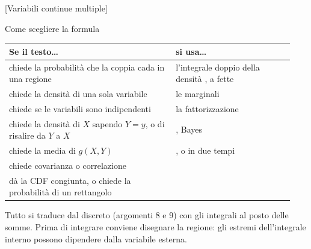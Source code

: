 [Variabili continue
  multiple]

\begin{scelta}{Come scegliere la formula}
\renewcommand{\arraystretch}{1.25}
\begin{tabular}{@{}P{0.55\linewidth}P{0.39\linewidth}@{}}
  \toprule
  \textbf{Se il testo\ldots} & \textbf{si usa\ldots} \\
  \midrule
  chiede la probabilità che la coppia cada in una regione & l'integrale doppio della densità ,
    a fette \\
  chiede la densità di una sola variabile & le marginali  \\
  chiede se le variabili sono indipendenti & la fattorizzazione  \\
  chiede la densità di $X$ sapendo $Y = y$, o di risalire da $Y$ a $X$ & , Bayes  \\
  chiede la media di $g(X, Y)$ & , o in due tempi  \\
  chiede covarianza o correlazione &  \\
  dà la CDF congiunta, o chiede la probabilità di un rettangolo &  \\
  \bottomrule
\end{tabular}

Tutto si traduce dal discreto (argomenti 8 e 9) con gli integrali al posto delle somme. Prima di integrare conviene
disegnare la regione: gli estremi dell'integrale interno possono dipendere dalla variabile esterna.
\end{scelta}



